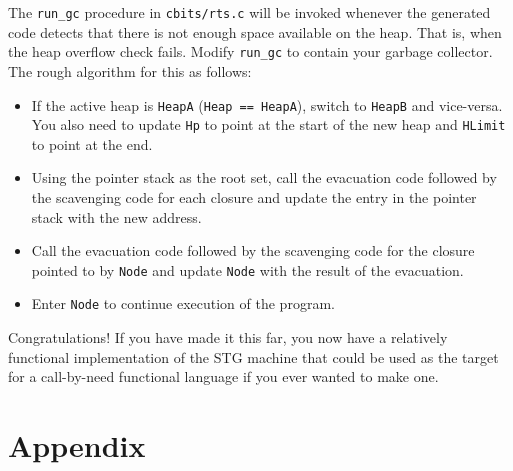 \documentclass[10pt,a4paper]{exam} %
\begin{document}
\begin{questions}
\question The \texttt{run\_gc} procedure in \texttt{cbits/rts.c} will be invoked whenever the generated code detects that there is not enough space available on the heap. That is, when the heap overflow check fails. Modify \texttt{run\_gc} to contain your garbage collector. The rough algorithm for this as follows:
\begin{itemize}
\item If the active heap is \texttt{HeapA} (\texttt{Heap == HeapA}), switch to \texttt{HeapB} and vice-versa. You also need to update \texttt{Hp} to point at the start of the new heap and \texttt{HLimit} to point at the end.
\item Using the pointer stack as the root set, call the evacuation code followed by the scavenging code for each closure and update the entry in the pointer stack with the new address.
\item Call the evacuation code followed by the scavenging code for the closure pointed to by \texttt{Node} and update \texttt{Node} with the result of the evacuation.
\item Enter \texttt{Node} to continue execution of the program.
\end{itemize}
\end{questions}
Congratulations! If you have made it this far, you now have a relatively functional implementation of the STG machine that could be used as the target for a call-by-need functional language if you ever wanted to make one. 

\newpage
\appendix
\section{Appendix}

 \pagebreak


\end{document}

